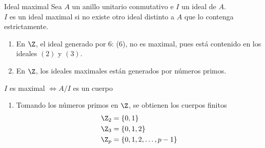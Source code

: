 \documentclass[10pt,t]{beamer}
\begin{document}
\begin{frame}
    \begin{block}{\centering \large Ideal maximal}
        Sea $A$ un anillo unitario conmutativo e $I$ un ideal de $A$.\\[0.3ex]
        $I$ es un ideal maximal si no existe otro ideal distinto a $A$ que lo contenga estrictamente.
    \end{block}

    \begin{plainexample}
        \begin{enumerate}[label=--]
            \item En $\Z$, el ideal generado por 6: (6), no es maximal, pues está contenido en los ideales $(2)$ y $(3)$.
            \item En $\Z$, los ideales maximales están generados por números primos.
        \end{enumerate}
    \end{plainexample}

    \begin{prop}
        \centering $I$ es maximal $\iff A/I$ es un cuerpo
    \end{prop}

    \begin{plainexample}
        \begin{enumerate}[label=--]
            \item Tomando los números primos en $\Z$, se obtienen los cuerpos finitos 
            \vspace*{-1.7em}
            \begin{align*}
                \Z_2 &= \{0,1\}\\
                \Z_3 &= \{0,1,2\}\\
                \Z_p &= \{0,1,2, \ldots, p-1\}
            \end{align*}
        \end{enumerate}
    \end{plainexample}
\end{frame}
\end{document}
